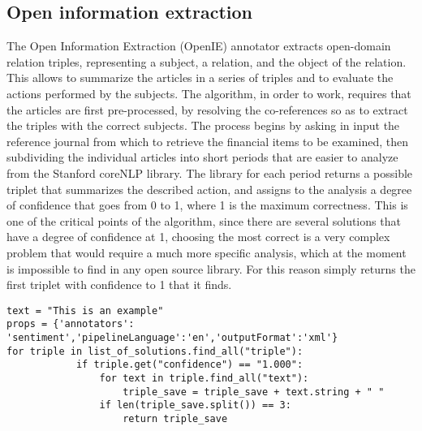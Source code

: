 \subsection{Open information extraction}
The Open Information Extraction (OpenIE) annotator extracts open-domain relation triples, representing a subject, a relation, and the object of the relation. This allows to summarize the articles in a series of triples and to evaluate the actions performed by the subjects. 
The algorithm, in order to work, requires that the articles are first pre-processed, by resolving the co-references so as to extract the triples with the correct subjects. 
The process begins by asking in input the reference journal from which to retrieve the financial items to be examined, then subdividing the individual articles into short periods that are easier to analyze from the Stanford coreNLP library. The library for each period returns a possible triplet that summarizes the described action, and assigns to the analysis a degree of confidence that goes from 0 to 1, where 1 is the maximum correctness. This is one of the critical points of the algorithm, since there are several solutions that have a degree of confidence at 1, choosing the most correct is a very complex problem that would require a much more specific analysis, which at the moment is impossible to find in any open source library. For this reason simply returns the first triplet with confidence to 1 that it finds.
\begin{verbatim}
text = "This is an example"
props = {'annotators': 'sentiment','pipelineLanguage':'en','outputFormat':'xml'}
for triple in list_of_solutions.find_all("triple"):
            if triple.get("confidence") == "1.000":
                for text in triple.find_all("text"):
                    triple_save = triple_save + text.string + " "
                if len(triple_save.split()) == 3:
                    return triple_save
\end{verbatim}

